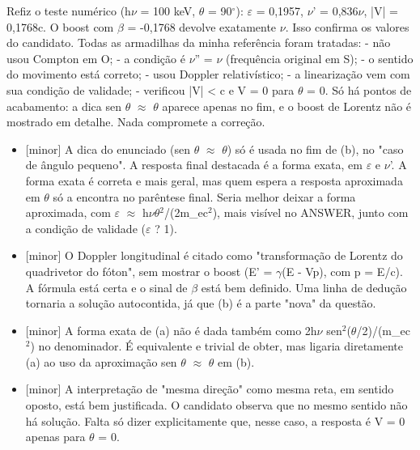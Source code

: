 \documentclass{article}%
\begin{document}
\newline%
Refiz o teste numérico (h$\nu$ = 100 keV, $\theta$ = 90$^\circ$): $\varepsilon$ = 0,1957, $\nu$' = 0,836$\nu$, |V| = 0,1768c. O boost com $\beta$ = -0,1768 devolve exatamente $\nu$. Isso confirma os valores do candidato.\newline%
\newline%
Todas as armadilhas da minha referência foram tratadas:\newline%
{-} não usou Compton em O;\newline%
{-} a condição é $\nu$'' = $\nu$ (frequência original em S);\newline%
{-} o sentido do movimento está correto;\newline%
{-} usou Doppler relativístico;\newline%
{-} a linearização vem com sua condição de validade;\newline%
{-} verificou |V| < c e V = 0 para $\theta$ = 0.\newline%
\newline%
Só há pontos de acabamento: a dica sen $\theta$ $\approx$ $\theta$ aparece apenas no fim, e o boost de Lorentz não é mostrado em detalhe. Nada compromete a correção.%
\begin{itemize}%
\item%
{[}minor{]} A dica do enunciado (sen $\theta$ $\approx$ $\theta$) só é usada no fim de (b), no "caso de ângulo pequeno". A resposta final destacada é a forma exata, em $\varepsilon$ e $\nu$'. A forma exata é correta e mais geral, mas quem espera a resposta aproximada em $\theta$ só a encontra no parêntese final. Seria melhor deixar a forma aproximada, com $\varepsilon$ $\approx$ h$\nu$$\theta$$^2$/(2m\_ec$^2$), mais visível no ANSWER, junto com a condição de validade ($\varepsilon$ ? 1).%
\item%
{[}minor{]} O Doppler longitudinal é citado como "transformação de Lorentz do quadrivetor do fóton", sem mostrar o boost (E' = $\gamma$(E - Vp), com p = E/c). A fórmula está certa e o sinal de $\beta$ está bem definido. Uma linha de dedução tornaria a solução autocontida, já que (b) é a parte "nova" da questão.%
\item%
{[}minor{]} A forma exata de (a) não é dada também como 2h$\nu$ sen$^2$($\theta$/2)/(m\_ec$^2$) no denominador. É equivalente e trivial de obter, mas ligaria diretamente (a) ao uso da aproximação sen $\theta$ $\approx$ $\theta$ em (b).%
\item%
{[}minor{]} A interpretação de "mesma direção" como mesma reta, em sentido oposto, está bem justificada. O candidato observa que no mesmo sentido não há solução. Falta só dizer explicitamente que, nesse caso, a resposta é V = 0 apenas para $\theta$ = 0.%
\end{itemize}%
\end{document}
